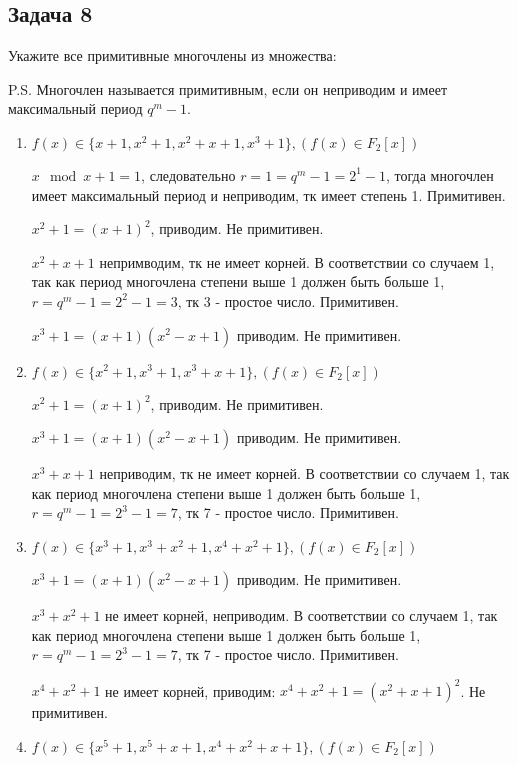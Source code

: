 \documentclass[utf8x, 14pt]{G7-32} %
\begin{document}
\subsection{Задача 8}
Укажите все примитивные многочлены из множества:


P.S. Многочлен называется примитивным, если он неприводим и имеет максимальный период $q^m - 1$.

\begin{enumerate}
    \item $f(x)\in\{x+1, x^2+1, x^2+x+1, x^3+1\}, (f(x)\in F_2[x])$
    
    $x \mod x+1 = 1$, следовательно $ r = 1 = q^m -1 = 2^1 -1$, тогда многочлен имеет максимальный период и неприводим, тк имеет степень 1. Примитивен.
    
    $x^2 + 1 = (x+1)^2$, приводим. Не примитивен.
    
    $ x^2+x+1$ непримводим, тк не имеет корней. В соответствии со случаем 1, так как период многочлена степени выше 1 должен быть больше 1, $r = q^m -1 = 2^2 - 1 = 3$, тк 3 - простое число. Примитивен.
    
    $x^3 + 1 = (x+1)(x^2 - x + 1)$ приводим. Не примитивен.

    \item $f(x)\in\{x^2+1, x^3+1, x^3+x+1\}, (f(x)\in F_2[x])$
    
    $x^2 + 1 = (x+1)^2$, приводим. Не примитивен.
    
    $x^3 + 1 = (x+1)(x^2 - x + 1)$ приводим. Не примитивен.
    
    $x^3+x+1$ неприводим, тк не имеет корней. В соответствии со случаем 1, так как период многочлена степени выше 1 должен быть больше 1, $r = q^m -1 = 2^3 - 1 = 7$, тк 7 - простое число. Примитивен.

    \item $f(x)\in\{x^3+1, x^3+x^2+1, x^4+x^2+1\}, (f(x)\in F_2[x])$
    
    $x^3 + 1 = (x+1)(x^2 - x + 1)$ приводим. Не примитивен.
    
    $x^3+x^2+1$ не имеет корней, неприводим. В соответствии со случаем 1, так как период многочлена степени выше 1 должен быть больше 1, $r = q^m -1 = 2^3 - 1 = 7$, тк 7 - простое число. Примитивен.
    
    $ x^4+x^2+1$ не имеет корней, приводим: $ x^4+x^2+1 = (x^2+x+1)^2$. Не примитивен.

    \item $f(x)\in\{x^5+1, x^5+x+1, x^4+x^2+x+1\}, (f(x)\in F_2[x])$
    

\end{enumerate}
\end{document}
